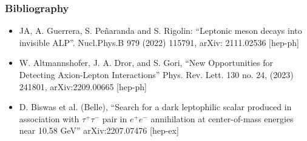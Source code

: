 \documentclass[mathserif, 10pt, aspectratio=169]{beamer}
\begin{document}
\begin{frame}\frametitle{Bibliography}
    \begin{itemize}\setlength{\itemsep}{7pt}
        \item JA, A. Guerrera, S. Peñaranda and S. Rigolin: ``Leptonic meson decays into invisible ALP''. Nucl.Phys.B 979 (2022) 115791, arXiv:    2111.02536 [hep-ph]
        \item W. Altmannshofer, J. A. Dror, and S. Gori, ``New Opportunities for Detecting Axion-Lepton Interactions'' Phys.
        Rev. Lett. 130 no. 24, (2023) 241801, arXiv:2209.00665 [hep-ph]
        \item D. Biswas et al. (Belle), ``Search for a dark leptophilic scalar produced in association with $\tau^+\tau^-$ pair
        in $e^+e^-$ annihilation at center-of-mass energies near 10.58 GeV'' arXiv:2207.07476 [hep-ex]
    \end{itemize}
\end{frame}
\end{document}
